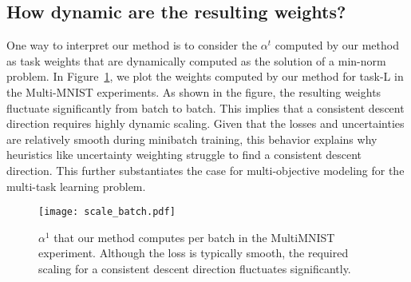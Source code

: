 \subsection{How dynamic are the resulting weights?}
\label{sec:additional_ablation}
One way to interpret our method is to consider the $\alpha^t$ computed by our method as task weights that are dynamically computed as the solution of a min-norm problem. In Figure~\ref{fig:mnist_scales}, we plot the weights computed by our method for task-L in the Multi-MNIST experiments. As shown in the figure, the resulting weights fluctuate significantly from batch to batch. This implies that a consistent descent direction requires highly dynamic scaling. Given that the losses and uncertainties are relatively smooth during minibatch training, this behavior explains why heuristics like uncertainty weighting \citep{Kendall2018} struggle to find a consistent descent direction. This further substantiates the case for multi-objective modeling for the multi-task learning problem.

\begin{figure}[H]%
\texttt{[image: scale\_batch.pdf]}
\caption{$\alpha^1$ that our method computes per batch in the MultiMNIST experiment. Although the loss is typically smooth, the required scaling for a consistent descent direction fluctuates significantly.}
\label{fig:mnist_scales}
\end{figure}
\fi